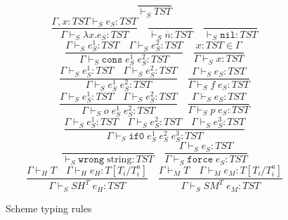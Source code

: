 \begin{figure}[p]
\[
\frac{}{\vdash_{S}TST}
\]
\bigskip
\[
\frac{\Gamma,x:TST\vdash_{S}e_{S}:TST}{\Gamma\vdash_{S}\lambda x.e_{S}:TST}
\quad
\frac{}{\vdash_{S}\overline{n}:TST}
\quad
\frac{}{\vdash_{S}\mathtt{nil}:TST}
\]
\[
\frac{\Gamma\vdash_{S}e_{S}^{1}:TST\quad\Gamma\vdash_{S}e_{S}^{2}:TST}{\Gamma\vdash_{S}\mathtt{cons}\;e_{S}^{1}\;e_{S}^{2}:TST}
\quad
\frac{x:TST\in\Gamma}{\Gamma\vdash_{S}x:TST}
\]
\[
\frac{\Gamma\vdash_{S}e_{S}^{1}:TST\quad\Gamma\vdash_{S}e_{S}^{2}:TST}{\Gamma\vdash_{S}e_{S}^{1}\;e_{S}^{2}:TST}
\quad
\frac{\Gamma\vdash_{S}e_{S}:TST}{\Gamma\vdash_{S}f\;e_{S}:TST}
\]
\[
\frac{\Gamma\vdash_{S}e_{S}^{1}:TST\quad\Gamma\vdash_{S}e_{S}^{2}:TST}{\Gamma\vdash_{S}o\;e_{S}^{1}\;e_{S}^{2}:TST}
\quad
\frac{\Gamma\vdash_{S}e_{S}:TST}{\Gamma\vdash_{S}p\;e_{S}:TST}
\]
\[
\frac{\Gamma\vdash_{S}e_{S}^{1}:TST\quad\Gamma\vdash_{S}e_{S}^{2}:TST\quad\Gamma\vdash_{S}e_{S}^{3}:TST}{\Gamma\vdash_{S}\mathtt{if0}\;e_{S}^{1}\;e_{S}^{2}\;e_{S}^{3}:TST}
\]
\[
\frac{}{\vdash_{S}\mathtt{wrong}\;\mathrm{string}:TST}
\quad
\frac{\Gamma\vdash_{S}e_{S}:TST}{\Gamma\vdash_{S}\mathtt{force}\;e_{S}:TST}
\]
\[
\frac{\Gamma\vdash_{H}T\quad\Gamma\vdash_{H}e_{H}:T[T_{i}/T^{a}_{i}]}{\Gamma\vdash_{S}SH^{T}\;e_{H}:TST}
\quad
\frac{\Gamma\vdash_{M}T\quad\Gamma\vdash_{M}e_{M}:T[T_{i}/T^{a}_{i}]}{\Gamma\vdash_{S}SM^{T}\;e_{M}:TST}
\]
\caption{Scheme typing rules}
\label{str}
\end{figure}